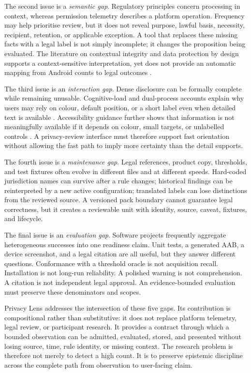 The second issue is a \emph{semantic gap}. Regulatory principles concern processing in context, whereas permission telemetry describes a platform operation. Frequency may help prioritise review, but it does not reveal purpose, lawful basis, necessity, recipient, retention, or applicable exception. A tool that replaces these missing facts with a legal label is not simply incomplete; it changes the proposition being evaluated. The literature on contextual integrity and data protection by design supports a context-sensitive interpretation, yet does not provide an automatic mapping from Android counts to legal outcomes \cite{5,eurlex2016,edpb2019}.

The third issue is an \emph{interaction gap}. Dense disclosure can be formally complete while remaining unusable. Cognitive-load and dual-process accounts explain why users may rely on colour, default position, or a short label even when detailed text is available \cite{27,22}. Accessibility guidance further shows that information is not meaningfully available if it depends on colour, small targets, or unlabelled controls \cite{wcag22,androidaccess}. A privacy-review interface must therefore support fast orientation without allowing the fast path to imply more certainty than the detail supports.

The fourth issue is a \emph{maintenance gap}. Legal references, product copy, thresholds, and test fixtures often evolve in different files and at different speeds. Hard-coded jurisdiction names can survive after a rule changes; historical findings can be reinterpreted by a new active configuration; translated labels can lose distinctions from the reviewed source. A versioned pack boundary cannot guarantee legal correctness, but it creates a reviewable unit with identity, source, caveat, fixtures, and lifecycle.

The final issue is an \emph{evaluation gap}. Software projects frequently aggregate heterogeneous successes into one readiness claim. Unit tests, a generated AAB, a device screenshot, and a legal citation are all useful, but they answer different questions. Conformance with a threshold oracle is not acquisition recall. Installation is not long-run reliability. A polished warning is not comprehension. A citation is not independent legal approval. An evidence-bounded evaluation must preserve these denominators and scopes.

Privacy Lens addresses the intersection of these five gaps. Its contribution is compositional rather than substitutive: it does not replace platform telemetry, legal review, or participant research. It provides a contract through which a bounded observation can be admitted, evaluated, stored, and presented without losing source, time, rule identity, or missing context. The research problem is therefore not merely to detect a high count. It is to preserve epistemic discipline across the complete path from observation to user-facing claim.

